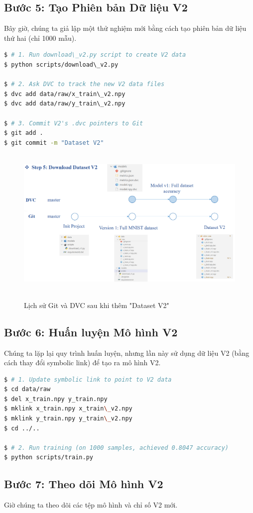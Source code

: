 \documentclass[11pt]{article}
\begin{document}
\subsection{Bước 5: Tạo Phiên bản Dữ liệu V2}
Bây giờ, chúng ta giả lập một thử nghiệm mới bằng cách tạo phiên bản dữ liệu thứ hai (chỉ 1000 mẫu).

\begin{lstlisting}[language=bash]
$ # 1. Run download\_v2.py script to create V2 data
$ python scripts/download\_v2.py

$ # 2. Ask DVC to track the new V2 data files
$ dvc add data/raw/x_train\_v2.npy
$ dvc add data/raw/y_train\_v2.npy

$ # 3. Commit V2's .dvc pointers to Git
$ git add .
$ git commit -m "Dataset V2"
\end{lstlisting}

\begin{figure}[H]
    \centering
    \includegraphics[width=0.7\linewidth]{images/p14.png}
    \caption{Lịch sử Git và DVC sau khi thêm "Dataset V2"}
\end{figure}

\subsection{Bước 6: Huấn luyện Mô hình V2}
Chúng ta lặp lại quy trình huấn luyện, nhưng lần này sử dụng dữ liệu V2 (bằng cách thay đổi symbolic link) để tạo ra mô hình V2.

\begin{lstlisting}[language=bash]
$ # 1. Update symbolic link to point to V2 data
$ cd data/raw
$ del x_train.npy y_train.npy
$ mklink x_train.npy x_train\_v2.npy
$ mklink y_train.npy y_train\_v2.npy
$ cd ../..

$ # 2. Run training (on 1000 samples, achieved 0.8047 accuracy)
$ python scripts/train.py
\end{lstlisting}

\subsection{Bước 7: Theo dõi Mô hình V2}
Giờ chúng ta theo dõi các tệp mô hình và chỉ số V2 mới.
\end{document}
